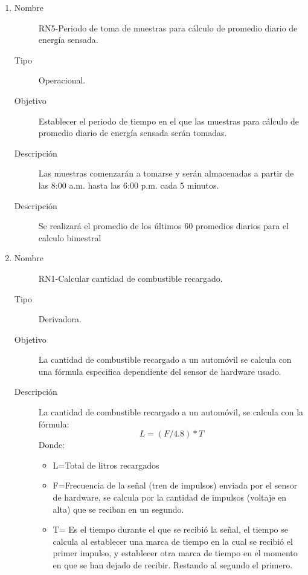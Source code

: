 \begin{enumerate}[label=RN\arabic*.]
\item \label{RN5}
		\begin{description}
			\item[Nombre] RN5-Periodo de toma de muestras para cálculo de promedio diario de energía sensada.
			\item[Tipo] Operacional.
			\item[Objetivo] Establecer el periodo de tiempo en el que las muestras para cálculo de promedio diario de energía sensada serán tomadas.
			\item[Descripción] Las muestras comenzarán a tomarse y serán almacenadas a partir de las 8:00 a.m. hasta las 6:00 p.m. cada 5 minutos.
			\item[Descripción] Se realizará el promedio de los últimos 60 promedios diarios para el calculo bimestral
		\end{description}













	\item \label{RN1}
		\begin{description}
			\item[Nombre] RN1-Calcular cantidad de combustible recargado.
			\item[Tipo] Derivadora.
			\item[Objetivo] La cantidad de combustible recargado a un automóvil se calcula con una fórmula especifica dependiente del sensor de hardware usado.
			\item[Descripción] La cantidad de combustible recargado a un automóvil, se calcula con la fórmula: $$L=(F/4.8)*T$$
			Donde:
				\begin{itemize}
					\item L=Total de litros recargados
					\item F=Frecuencia de la señal (tren de impulsos) enviada por el sensor de hardware, se calcula por la cantidad de impulsos (voltaje en alta) que se reciban en un segundo.
					\item T= Es el tiempo durante el que se recibió la señal, el tiempo se calcula al establecer una marca de tiempo en la cual se recibió el primer impulso, y establecer otra marca de tiempo en el momento en que se han dejado de recibir. Restando al segundo el primero.\cite{FS400A-G1}
				\end{itemize}
		\end{description}


\end{enumerate}

